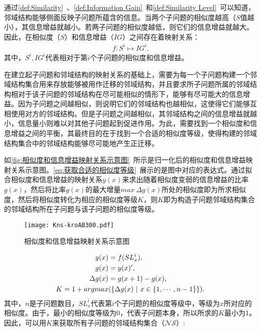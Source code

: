 \par
通过\autoref{def:Similarity}~、\autoref{def:Information Gain}~和\autoref{def:Similarity Level}~可以知道，邻域结构能够侧面反映子问题所蕴含的信息。当两个子问题的相似度越高（$S$值越小），其信息增益就越小。若两子问题的相似度越低，则它们的信息增益就越大。因此，在相似度（$S$）和信息增益（$IG$）之间存在着映射关系：
\begin{align}
    \label{eq:相似度与信息增益的映射关系}
    f: S^i \mapsto IG^i.
\end{align}
其中，$S^i, IG^i$代表相对于第$i$个子问题的相似度和信息增益。
\par
在建立起子问题和邻域结构的映射关系的基础上，需要为每一个子问题构建一个邻域结构集合用来存放能够被用作迁移的邻域结构，并且要求所子问题所属的邻域结构相对于该子问题的邻域结构在尽可能相似的情形下，能够有尽可能大的信息增益。因为子问题之间越相似，则说明它们的邻域结构也越相似，这使得它们能够互相使用对方的邻域结构。但是子问题之间越相似，其邻域结构之间的信息增益就越小，信息量小则难以对其他子问题起到促进作用。为此，需要找到一个相似度和信息增益之间的平衡，其最终目的在于找到一个合适的相似度等级，使得构建的邻域结构集合中的邻域结构能够尽可能地产生正迁移。
\par
如\autoref{fig:相似度和信息增益映射关系示意图}~所示是归一化后的相似度和信息增益映射关系示意图。\autoref{eq:获取合适的相似度等级}~展示的是图中对应的表达式。通过拟合相似度和信息增益的映射关系$y(x)$来求出随着相似度变弱的信息增益的比率$g(x)$，然后将比率$g(x)$的最大增量$max \ \Delta g(x)$所处的相似度即为所求相似度，然后将相似度转化为相应的相似度等级$K$，则$K$即为构造子问题邻域结构集合的邻域结构所在子问题与该子问题的相似度等级。
\begin{figure}[htb]
    \texttt{[image: Kns-kroAB300.pdf]}
    \caption[相似度和信息增益映射关系示意图]{相似度和信息增益映射关系示意图}
    \label{fig:相似度和信息增益映射关系示意图}
\end{figure}
\vspace{-1em}
\begin{align}
    \label{eq:获取合适的相似度等级}
    y(x) &= f(SL^i_x), \\
    g(x) &= y(x)', \notag \\
    \Delta g(x) &= g(x+1) - g(x), \notag \\
    K = 1 + argmax&(\{\Delta g(x) \ | \  x \in \{1, \cdots, n-1\} \}).  \notag
\end{align}
其中，$n$是子问题数目，$SL^i_x$代表第$i$个子问题的相似度等级中，等级为$x$所对应的相似度。由于，最小的相似度等级为0，代表子问题本身，所以所求的$K$最小为1。因此，可以用$K$来获取所有子问题的邻域结构集合（$\mathcal{NS}$）:
